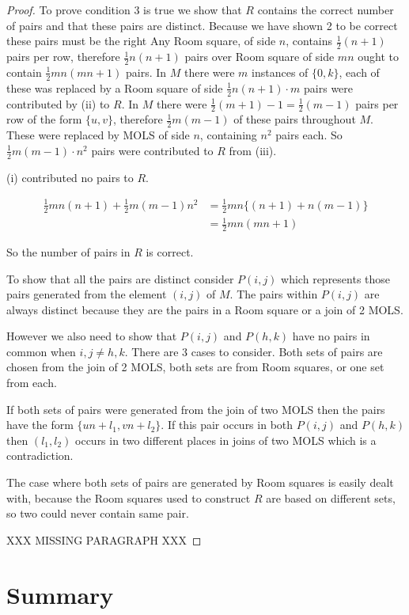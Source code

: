 \documentclass[
  11pt,
  a4paper]{book}
\begin{document}
\begin{proof}
To prove condition 3 is true we show that $R$ contains the
correct number of pairs and that these pairs are distinct.
Because we have shown 2 to be correct these pairs must be
the right Any Room square, of side $n$, contains
$\frac{1}{2}(n + 1)$ pairs per row, therefore
$\frac{1}{2}n(n + 1)$ pairs over Room square of side $mn$
ought to contain $\frac{1}{2}mn(mn + 1)$ pairs.  In $M$ there
were $m$ instances of $\{0, k\}$, each of these was replaced
by a Room square of side $\frac{1}{2}n(n + 1) \cdot m$ pairs
were contributed by (ii) to $R$.  In $M$ there were
$\frac{1}{2}(m + 1) - 1 = \frac{1}{2} (m  -1)$ pairs per
row of the form $\{u, v\}$, therefore $\frac{1}{2}m(m - 1)$
of these pairs throughout $M$. These were replaced by MOLS
of side $n$, containing $n^2$ pairs each. So
$\frac{1}{2}m(m - 1) \cdot n^2$ pairs were contributed to
$R$ from (iii). 

(i) contributed no pairs to $R$.

\begin{align*}
\frac{1}{2} mn(n + 1) + \frac{1}{2}m(m - 1)n^2 &= \frac{1}{2}mn\{(n+1)+n(m-1)\} \\
&=\frac{1}{2}mn(mn+1)
\end{align*}

So the number of pairs in $R$ is correct.

To show that all the pairs are distinct consider $P(i,j)$
which represents those pairs generated from the element
$(i,j)$ of $M$. The pairs within $P(i,j)$ are always
distinct because they are the pairs in a Room square or a
join of 2 MOLS.

However we also need to show that $P(i,j)$ and $P(h,k)$ have
no pairs in common when $i,j \neq h,k$. There are 3 cases to
consider. Both sets of pairs are chosen from the join of 2 MOLS,
both sets are from Room squares, or one set from each.

If both sets of pairs were generated from the join of two
MOLS then the pairs have the form $\{un + l_1, vn + l_2\}$.
If this pair occurs in both $P(i,j)$ and $P(h,k)$ then
$(l_1, l_2)$ occurs in two different places in joins of two
MOLS which is a contradiction.

The case where both sets of pairs are generated by Room
squares is easily dealt with, because the Room squares used
to construct $R$ are based on different sets, so two could
never contain same pair.

XXX MISSING PARAGRAPH XXX
\end{proof}

\hypertarget{summary}{%
\section{Summary}\label{summary}}
\end{document}
